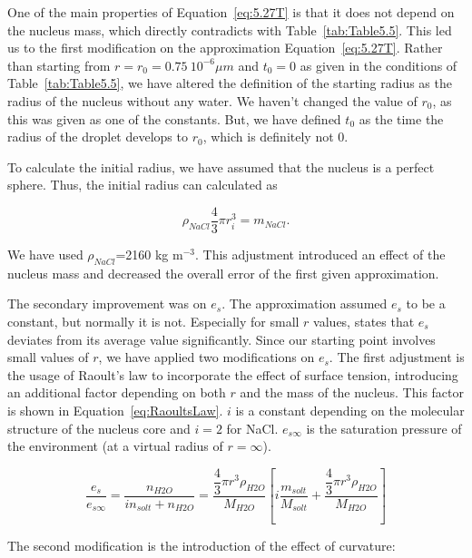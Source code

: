 \documentclass[titlepage]{article}
\begin{document}
One of the main properties of Equation~\eqref{eq:5.27T} is that it does not
depend on the nucleus mass, which directly contradicts with
Table~\ref{tab:Table5.5}. This led us to the first modification on the
approximation Equation~\eqref{eq:5.27T}. Rather than starting from
$r=r_{0}=0.75\ 10^{-6} \mu m$ and $t_{0}=0$ as given in the conditions of
Table~\ref{tab:Table5.5}, we have altered the definition of the starting radius
as the radius of the nucleus without any water. We haven't changed the value of
$r_{0}$, as this was given as one of the constants. But, we have defined
$t_{0}$ as the time the radius of the droplet develops to $r_{0}$, which is
definitely not $0$.

To calculate the initial radius, we have assumed that the nucleus is a perfect
sphere. Thus, the initial radius can calculated as

\begin{equation}
    \label{eq:InitialRadius}
    \rho_{NaCl}\frac{4}{3}\pi r_{i}^{3}=m_{NaCl} .
\end{equation}

We have used $\rho_{NaCl}$=2160 kg m$^{-3}$. This adjustment introduced an
effect of the nucleus mass and decreased the overall error of the first given
approximation.

The secondary improvement was on $e_{s}$. The approximation assumed $e_{s}$ to
be a constant, but normally it is not. Especially for small $r$ values,
\cite{Best} states that $e_{s}$ deviates from its average value significantly.
Since our starting point involves small values of $r$, we have applied two
modifications on $e_{s}$. The first adjustment is the usage of Raoult's law to
incorporate the effect of surface tension, introducing an additional factor
depending on both $r$ and the mass of the nucleus. This factor is shown in
Equation~\eqref{eq:RaoultsLaw}. $i$ is a constant depending on the molecular
structure of the nucleus core and $i=2$ for NaCl. $e_{s\infty}$ is the
saturation pressure of the environment (at a virtual radius of $r=\infty$).

\begin{equation}
    \label{eq:RaoultsLaw}
    \dfrac{e_{s}}{e_{s\infty}} = \dfrac{n_{H2O}}{i n_{solt}+n_{H2O}} = \dfrac{\dfrac{4}{3}\pi r^{3} \rho_{H2O}}{M_{H2O}} \left[ i \dfrac{m_{solt}}{M_{solt}} + \dfrac{\dfrac{4}{3}\pi r^{3} \rho_{H2O}}{M_{H2O}} \right]
\end{equation}

The second modification is the introduction of the effect of curvature:
\end{document}

